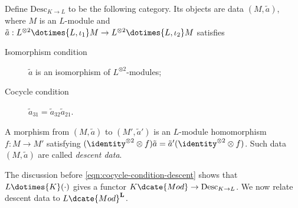 \begin{definition}
	Define $\mathrm{Desc}_{K\to L}$ to be the following category. Its objects
	are data $(M,\tilde a)$, where $M$ is an $L$-module and
	$\tilde a:L^{\otimes2}\dotimes{L,\iota_1}M\to
	L^{\otimes2}\dotimes{L,\iota_2}M$ satisfies
	\begin{description}
		\item[Isomorphism condition] $\tilde a$ is an isomorphism of
		$L^{\otimes2}$-modules;
		\item[Cocycle condition] $\tilde a_{31}=\tilde a_{32}\tilde a_{21}$.
	\end{description}

	A morphism from $(M,\tilde a)$ to $(M',\tilde a')$ is an $L$-module
	homomorphism $f:M\to M'$ satisfying
	$(\identity^{\otimes2}\otimes f)\tilde a=
	\tilde a'(\identity^{\otimes2}\otimes f)$. Such data $(M,\tilde a)$ are
	called \emph{descent data}.
\end{definition}

The discussion before \eqref{eqn:cocycle-condition-descent} shows that
$L\dotimes{K}(\mathord\cdot)$ gives a functor
$K\dcate{Mod}\to\mathrm{Desc}_{K\to L}$. We now relate descent data to
$L\dcate{Mod}^{\mathbf{L}}$.

